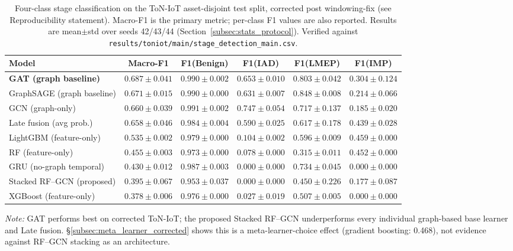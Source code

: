 \documentclass[pdflatex,sn-mathphys-num]{sn-jnl}
\theoremstyle{thmstyleone}%
\theoremstyle{thmstyletwo}%
\theoremstyle{thmstylethree}%
\begin{document}
\begin{table}[!t]
\centering
\caption{Four-class stage classification on the ToN-IoT asset-disjoint test split, corrected post windowing-fix (see Reproducibility statement).
Macro-F1 is the primary metric; per-class F1 values are also reported.
Results are mean$\pm$std over seeds 42/43/44 (Section~\ref{subsec:stats_protocol}). Verified against \texttt{results/toniot/main/stage\_detection\_main.csv}.}
\label{tab:main_4class_results_all}
\renewcommand{\arraystretch}{1.12}
{\tiny
\begin{tabular}{lccccc}
\toprule
\textbf{Model} & \textbf{Macro-F1} & \textbf{F1(Benign)} & \textbf{F1(IAD)} & \textbf{F1(LMEP)} & \textbf{F1(IMP)} \\
\midrule
\textbf{GAT (graph baseline)}
& $\mathbf{0.687\pm0.041}$ & $0.990\pm0.002$ & $0.653\pm0.010$ & $0.803\pm0.042$ & $0.304\pm0.124$ \\
GraphSAGE (graph baseline)
& $0.671\pm0.015$ & $0.990\pm0.000$ & $0.631\pm0.007$ & $0.848\pm0.008$ & $0.214\pm0.066$ \\
GCN (graph-only)
& $0.660\pm0.039$ & $0.991\pm0.002$ & $0.747\pm0.054$ & $0.717\pm0.137$ & $0.185\pm0.020$ \\
Late fusion (avg prob.)
& $0.658\pm0.046$ & $0.984\pm0.004$ & $0.590\pm0.025$ & $0.617\pm0.178$ & $0.439\pm0.028$ \\
\midrule
LightGBM (feature-only)
& $0.535\pm0.002$ & $0.979\pm0.000$ & $0.104\pm0.002$ & $0.596\pm0.009$ & $0.459\pm0.000$ \\
RF (feature-only)
& $0.455\pm0.003$ & $0.973\pm0.000$ & $0.078\pm0.000$ & $0.315\pm0.011$ & $0.452\pm0.000$ \\
GRU (no-graph temporal)\footnotemark[1]
& $0.430\pm0.012$ & $0.987\pm0.003$ & $0.000\pm0.000$ & $0.734\pm0.045$ & $0.000\pm0.000$ \\
Stacked RF--GCN (proposed)
& $0.395\pm0.067$ & $0.953\pm0.037$ & $0.000\pm0.000$ & $0.450\pm0.226$ & $0.177\pm0.087$ \\
XGBoost (feature-only)
& $0.378\pm0.006$ & $0.976\pm0.000$ & $0.027\pm0.019$ & $0.507\pm0.005$ & $0.000\pm0.000$ \\
\bottomrule
\end{tabular}
}
\footnotesize{\textit{Note:} GAT performs best on corrected ToN-IoT; the proposed Stacked RF--GCN underperforms every individual graph-based base learner and Late fusion. \S\ref{subsec:meta_learner_corrected} shows this is a meta-learner-choice effect (gradient boosting: 0.468), not evidence against RF--GCN stacking as an architecture.}
\end{table}
\end{document}
